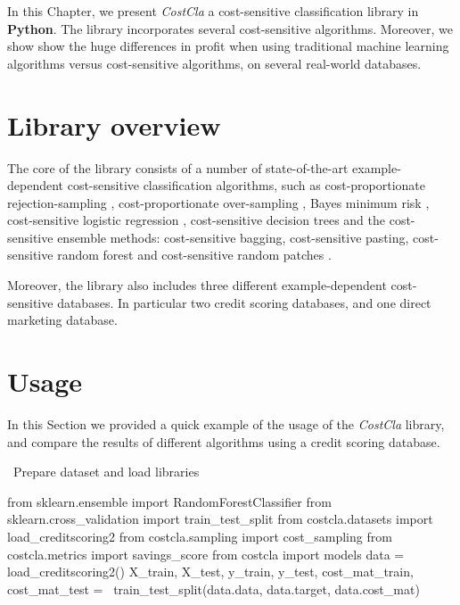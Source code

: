 In this Chapter, we present \textit{CostCla} a cost-sensitive classification library in 
\textbf{Python}. The library incorporates several cost-sensitive algorithms. Moreover, we show show 
the huge differences in profit when using traditional machine learning algorithms versus 
cost-sensitive algorithms, on several real-world databases.

\section{Library overview}

The core of the library consists of a number of state-of-the-art example-dependent cost-sensitive 
classification algorithms, such as cost-proportionate rejection-sampling \citep{Zadrozny2003}, 
cost-proportionate over-sampling \citep{Elkan2001}, Bayes minimum risk 
\citep{CorreaBahnsen2013,CorreaBahnsen2014}, cost-sensitive logistic regression 
\citep{CorreaBahnsen2014b}, cost-sensitive decision trees \citep{CorreaBahnsen2015} and the 
cost-sensitive ensemble methods: cost-sensitive bagging, cost-sensitive pasting, cost-sensitive 
random forest and cost-sensitive random patches \citep{CorreaBahnsen2015b}.

Moreover, the library also includes three different example-dependent cost-sensitive databases. In 
particular two credit scoring databases, and one direct marketing database.

\section{Usage}

In this Section we provided a quick example of the usage of the \textit{CostCla}  library, and 
compare the results of different algorithms using a credit scoring database.

\vskip0.3cm
\noindent \textbullet\ Prepare dataset and load libraries

\vskip0.3cm
\begin{pythoncode}
from sklearn.ensemble import RandomForestClassifier
from sklearn.cross_validation import train_test_split
from costcla.datasets import load_creditscoring2
from costcla.sampling import cost_sampling
from costcla.metrics import savings_score
from costcla import models
data = load_creditscoring2()
X_train, X_test, y_train, y_test, 
cost_mat_train, cost_mat_test = \
train_test_split(data.data, data.target, data.cost_mat)
\end{pythoncode}

